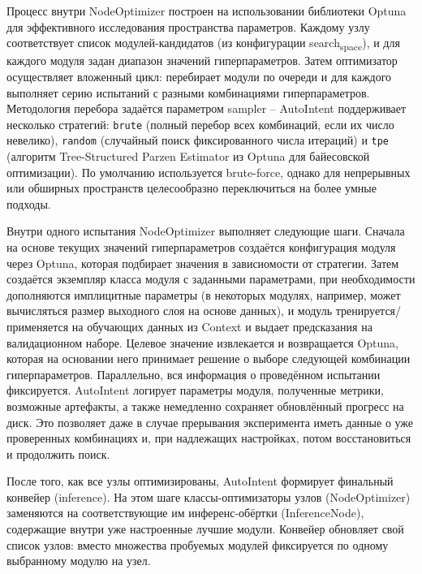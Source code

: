 \documentclass[14pt,a4paper,oneside,openany]{extbook}
\begin{document}
Процесс внутри NodeOptimizer построен на использовании библиотеки Optuna\autocite{akiba_optuna_2019a} для эффективного исследования пространства параметров. Каждому узлу соответствует список модулей-кандидатов (из конфигурации search\textsubscript{space}), и для каждого модуля задан диапазон значений гиперпараметров. Затем оптимизатор осуществляет вложенный цикл: перебирает модули по очереди и для каждого выполняет серию испытаний с разными комбинациями гиперпараметров. Методология перебора задаётся параметром sampler – AutoIntent поддерживает несколько стратегий: \texttt{brute} (полный перебор всех комбинаций, если их число невелико), \texttt{random} (случайный поиск фиксированного числа итераций) и \texttt{tpe} (алгоритм Tree-Structured Parzen Estimator из Optuna для байесовской оптимизации). По умолчанию используется brute-force, однако для непрерывных или обширных пространств целесообразно переключиться на более умные подходы.

Внутри одного испытания NodeOptimizer выполняет следующие шаги. Сначала на основе текущих значений гиперпараметров создаётся конфигурация модуля через Optuna, которая подбирает значения в зависиомости от стратегии. Затем создаётся экземпляр класса модуля с заданными параметрами, при необходимости дополняются имплицитные параметры (в некоторых модулях, например, может вычисляться размер выходного слоя на основе данных), и модуль тренируется/применяется на обучающих данных из Context и выдает предсказания на валидационном наборе. Целевое значение извлекается и возвращается Optuna, которая на основании него принимает решение о выборе следующей комбинации гиперпараметров. Параллельно, вся информация о проведённом испытании фиксируется. AutoIntent логирует параметры модуля, полученные метрики, возможные артефакты, а также немедленно сохраняет обновлённый прогресс на диск. Это позволяет даже в случае прерывания эксперимента иметь данные о уже проверенных комбинациях и, при надлежащих настройках, потом восстановиться и продолжить поиск.

После того, как все узлы оптимизированы, AutoIntent формирует финальный конвейер (inference). На этом шаге классы-оптимизаторы узлов (NodeOptimizer) заменяются на соответствующие им инференс-обёртки (InferenceNode), содержащие внутри уже настроенные лучшие модули. Конвейер обновляет свой список узлов: вместо множества пробуемых модулей фиксируется по одному выбранному модулю на узел.
\end{document}
